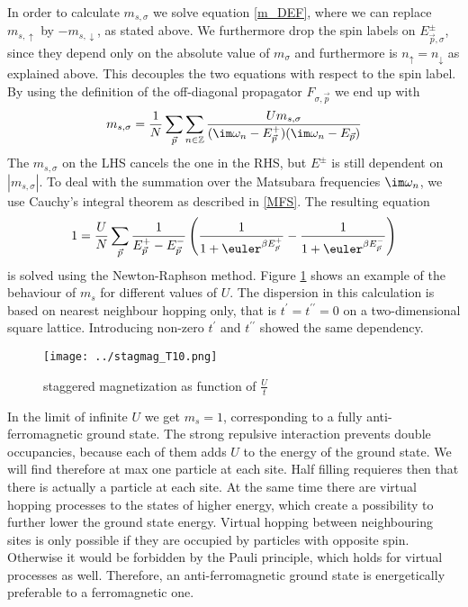 In order to calculate $m_ {s,\sigma}$ we solve equation \ref{m_DEF}, where we can replace $m_{s,\uparrow}$ by $-m_{s,\downarrow}$, as stated above.
We furthermore drop the spin labels on $E_{\vec p,\sigma}^{\pm}$, 
since they depend only on the absolute value of $m_{\sigma}$ and furthermore is $n_{\uparrow} = n_{\downarrow}$ as explained above.
This decouples the two equations with respect to the spin label.
By using the definition of the off-diagonal propagator $F_{\sigma,\vec{p}}$ we end up with
\begin{equation}
 m_{s,\sigma} = \frac1N \sum_{\vec{p}} \sum_{n\in \mathbb{Z}} 
							      \frac { Um_{s,\sigma} }
								    { (\im \omega_n - E_{\vec{p}}^+) (\im \omega_n - E_{\vec{p}})}
\end{equation}
The $m_{s,\sigma}$ on the LHS cancels the one in the RHS, but $E^{\pm}$ is still dependent on $|m_{s,\sigma}|$.
To deal with the summation over the Matsubara frequencies $\im \omega_n$, we use Cauchy's integral theorem as described in \ref{MFS}.
The resulting equation
\begin{equation}
 1= \frac{U}{N}\sum_{\vec{p}} \frac{1}{E_{\vec p}^+ - E_{\vec{p}}^-} \left( \frac{1}{1+\euler^{\beta E_{\vec p}^+}} - \frac{1}{1+\euler^{\beta E_{\vec p}^-}} \right)
\end{equation}
is solved using the Newton-Raphson method.
Figure \ref{ms_nn} shows an example of the behaviour of $m_s$ for different values of $U$. The dispersion in this calculation is based 
on nearest neighbour hopping only, that is $t^{\prime} = t^{\prime \prime} = 0$ on a two-dimensional square lattice.
Introducing non-zero $t^{\prime}$ and $t^{\prime \prime}$ showed the same dependency. 
%
%
\begin{figure}
 \texttt{[image: ../stagmag\_T10.png]}
 \caption{staggered magnetization as function of $\frac Ut$}
 \label{ms_nn} 
\end{figure}
%
In the limit of infinite $U$ we get $m_s=1$, corresponding to a fully anti-ferromagnetic ground state. 
The strong repulsive interaction prevents double occupancies, because each of them adds $U$ to the energy of the ground state.
We will find therefore at max one particle at each site. Half filling requieres then that there is actually a particle at each site. 
At the same time there are virtual hopping processes to the states of higher energy, which create  a possibility to further lower the ground state energy.
Virtual hopping between neighbouring sites is only possible if they are occupied by particles with opposite spin.
Otherwise it would be forbidden by the Pauli principle, which holds for virtual processes as well. 
Therefore, an anti-ferromagnetic ground state is energetically preferable to a ferromagnetic one.

